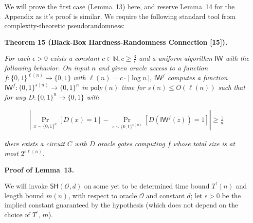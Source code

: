 \documentclass[10pt,a4paper]{article}
\begin{document}



We will prove the first case (Lemma 13) here, and reserve Lemma 14 for the Appendix as it’s proof is similar. We require the following standard tool from complexity-theoretic pseudorandomness:\par





\par\medskip\noindent\textbf{
\textbf{Theorem 15}\textbf{ }(Black-Box Hardness-Randomness Connection [15])\textbf{.}
}\par



\emph{For each $\epsilon>0$ exists a constant $c\in\mathbb{N},c\geq\frac{3}{\epsilon}$ and a uniform algorithm $\mathsf{IW}$ with the following behavior. On input $n$ and given oracle access to a function $f:\{0,1\}^{\ell(n)}\to\{0,1\}$ with $\ell(n)=c\cdot\lceil\log n\rceil$, $\mathsf{IW}^{f}$ computes a function $\mathsf{IW}^{f}:\{0,1\}^{s(n)}\to\{0,1\}^{n}$ in $\mathrm{poly}(n)$ time for $s(n)\leq O(\ell(n))$ such that for any $D:\{0,1\}^{n}\to\{0,1\}$ with}\par


\[\begin{gathered}
|\Pr_{x\sim\{0,1\}^{n}}[D(x)=1]-\Pr_{z\sim\{0,1\}^{s(n)}}[D(\mathsf{IW}^{f}(z))=1]|\geq\frac{1}{n}
\end{gathered}\]


\emph{there exists a circuit $C$ with $D$ oracle gates computing $f$ whose total size is at most $2^{\epsilon\ell(n)}$.}\par






\par\medskip\noindent\textbf{Proof of Lemma 13.}\par




We will invoke $\mathsf{SH}(\mathcal{O},d)$ on some yet to be determined time bound $T^{\prime}(n)$ and length bound $m(n)$, with respect to oracle $\mathcal{O}$ and constant $d$; let $\epsilon>0$ be the implied constant guaranteed by the hypothesis (which does not depend on the choice of $T^{\prime}$, $m$).\par
\end{document}
